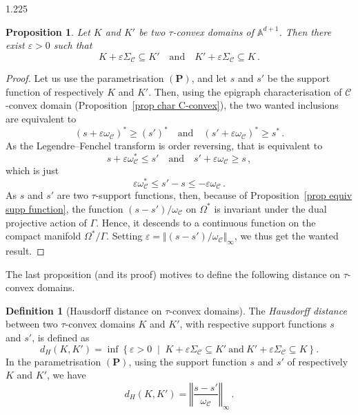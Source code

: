 \documentclass[reqno, a4paper]{amsart}
\numberwithin{equation}{section}
\numberwithin{figure}{section}
\newtheorem{proposition}[theorem]{Proposition}
\theoremstyle{definition}
\newtheorem{definition}[theorem]{Definition}
\theoremstyle{remark}
\newcommand{\A}{\mathbb{A}} %
\newcommand{\C}{\mathcal{C}} %
\renewcommand{\S}{\Sigma_\C} %
\newcommand{\st}{\; \middle\vert \;} %
\begin{document}
\begin{spacing}{1.225}
\begin{proposition}
Let $K$ and $K'$ be two $\tau$-convex domains of $\A^{d+1}$. Then there exist $\varepsilon >0$ such that
\begin{equation*}
K+ \varepsilon \S \subseteq K' \quad \text{and} \quad K'+ \varepsilon \S \subseteq K \, .
\end{equation*}
\end{proposition}
\begin{proof}
Let us use the parametrisation $(\mathbf{P})$, and let $s$ and $s'$ be the support function of respectively $K$ and $K'$. Then, using the epigraph characterisation of $\C$-convex domain (Proposition~\ref{prop char C-convex}), the two wanted inclusions are equivalent to 
\begin{equation*}
(s+\varepsilon\omega_\C)^* \geq (s')^* \quad \text{and} \quad (s'+\varepsilon\omega_\C)^* \geq s^* \, .
\end{equation*}
As the Legendre--Fenchel transform is order reversing, that is equivalent to
\begin{equation*}
s+\varepsilon\omega_\C^* \leq s' \quad \text{and} \quad s'+\varepsilon\omega_\C \geq s \, ,
\end{equation*}
which is just 
\begin{equation*}
\varepsilon\omega_\C^* \leq s'-s \leq -\varepsilon\omega_\C \, .
\end{equation*}
As $s$ and $s'$ are two $\tau$-support functions, then, because of Proposition~\ref{prop equiv supp function}, the function $(s-s')/\omega_\C$ on $\Omega^*$ is invariant under the dual projective action of $\Gamma$. Hence, it descends to a continuous function on the compact manifold $\Omega^*/\Gamma$. Setting $\varepsilon = \Vert (s-s')/\omega_\C\Vert_\infty$, we thus get the wanted result.
\end{proof}


The last proposition (and its proof) motives to define the following distance on $\tau$-convex domains. 

\begin{definition}[Hausdorff distance on $\tau$-convex domains]
The \emph{Hausdorff distance} between two $\tau$-convex domains $K$ and $K'$, with respective support functions $s$ and $s'$, is defined as 
\begin{equation*}
d_H(K,K') = \inf \left\lbrace \varepsilon >0 \st K+ \varepsilon \S \subseteq K' \ \text{and} \ K'+ \varepsilon \S \subseteq K\right\rbrace. 
\end{equation*}
In the parametrisation $(\mathbf{P})$, using the support function $s$ and $s'$ of respectively $K$ and $K'$, we have
\begin{equation*}
d_H(K,K') = \left\Vert \frac{s-s'}{\omega_\C}\right\Vert_\infty \, . 
\end{equation*}
\end{definition}


\end{spacing}
\end{document}
